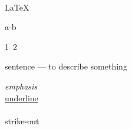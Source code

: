 \documentclass{book}
\begin{document}
\MF\ \MP

\LaTeX \hspace{2em} \XeTeX

\AmS

a-b

1--2

sentence --- to describe something


\noindent
\emph{emphasis} \\
\underline{underline} \\
 \\
\sout{strike-out}
\end{document}
